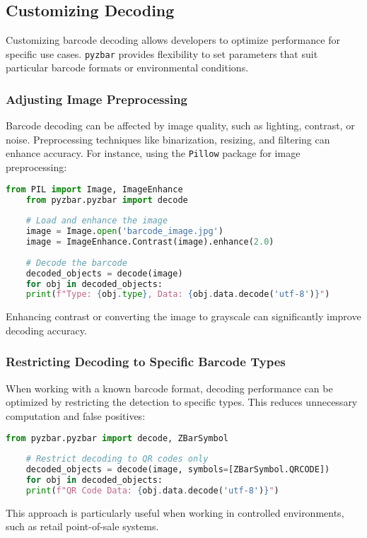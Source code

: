 \subsection{Customizing Decoding}
Customizing barcode decoding allows developers to optimize performance for specific use cases. \texttt{pyzbar} provides flexibility to set parameters that suit particular barcode formats or environmental conditions.

\subsubsection{Adjusting Image Preprocessing}
Barcode decoding can be affected by image quality, such as lighting, contrast, or noise. Preprocessing techniques like binarization, resizing, and filtering can enhance accuracy. For instance, using the \texttt{Pillow} package for image preprocessing:
\begin{lstlisting}[language=Python]
	from PIL import Image, ImageEnhance
	from pyzbar.pyzbar import decode
	
	# Load and enhance the image
	image = Image.open('barcode_image.jpg')
	image = ImageEnhance.Contrast(image).enhance(2.0)
	
	# Decode the barcode
	decoded_objects = decode(image)
	for obj in decoded_objects:
	print(f"Type: {obj.type}, Data: {obj.data.decode('utf-8')}")
\end{lstlisting}
Enhancing contrast or converting the image to grayscale can significantly improve decoding accuracy.

\subsubsection{Restricting Decoding to Specific Barcode Types}

When working with a known barcode format, decoding performance can be optimized by restricting the detection to specific types. This reduces unnecessary computation and false positives:

\begin{lstlisting}[language=Python]
	from pyzbar.pyzbar import decode, ZBarSymbol
	
	# Restrict decoding to QR codes only
	decoded_objects = decode(image, symbols=[ZBarSymbol.QRCODE])
	for obj in decoded_objects:
	print(f"QR Code Data: {obj.data.decode('utf-8')}")
\end{lstlisting}
This approach is particularly useful when working in controlled environments, such as retail point-of-sale systems.

